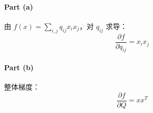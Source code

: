 \paragraph{Part (a)}  
由 \(f(x) = \sum_{i,j} q_{ij}x_i x_j\)，对 \(q_{ij}\) 求导：
\[
\frac{\partial f}{\partial q_{ij}} = x_i x_j
\]

\paragraph{Part (b)}  
整体梯度：
\[
\frac{\partial f}{\partial Q} = xx^T
\]